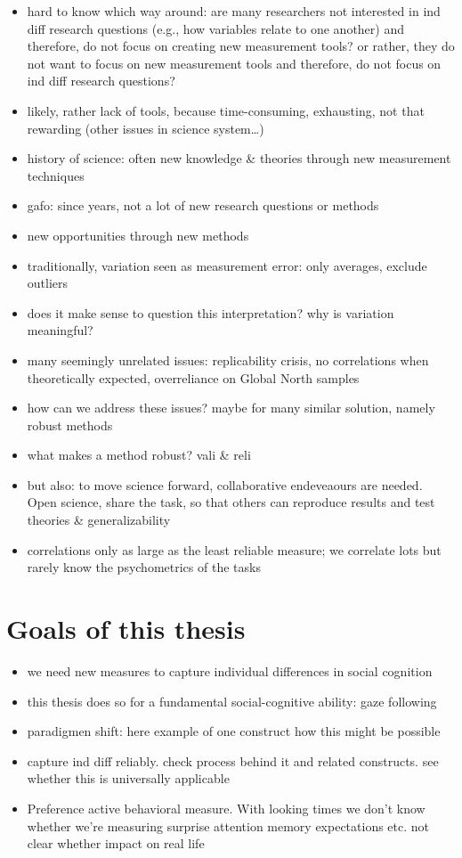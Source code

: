 \documentclass[
]{scrbook}
\providecommand{\tightlist}{%
  \setlength{\itemsep}{0pt}\setlength{\parskip}{0pt}}
\begin{document}
\begin{itemize}
\tightlist
\item
  hard to know which way around: are many researchers not interested in ind diff research questions (e.g., how variables relate to one another) and therefore, do not focus on creating new measurement tools? or rather, they do not want to focus on new measurement tools and therefore, do not focus on ind diff research questions?
\item
  likely, rather lack of tools, because time-consuming, exhausting, not that rewarding (other issues in science system\ldots)
\item
  history of science: often new knowledge \& theories through new measurement techniques
\item
  gafo: since years, not a lot of new research questions or methods
\item
  new opportunities through new methods
\item
  traditionally, variation seen as measurement error: only averages, exclude outliers
\item
  does it make sense to question this interpretation? why is variation meaningful?
\item
  many seemingly unrelated issues: replicability crisis, no correlations when theoretically expected, overreliance on Global North samples
\item
  how can we address these issues? maybe for many similar solution, namely robust methods
\item
  what makes a method robust? vali \& reli
\item
  but also: to move science forward, collaborative endeveaours are needed. Open science, share the task, so that others can reproduce results and test theories \& generalizability
\item
  correlations only as large as the least reliable measure; we correlate lots but rarely know the psychometrics of the tasks
\end{itemize}

\section{Goals of this thesis}\label{goals-of-this-thesis}

\begin{itemize}
\tightlist
\item
  we need new measures to capture individual differences in social cognition
\item
  this thesis does so for a fundamental social-cognitive ability: gaze following
\item
  paradigmen shift: here example of one construct how this might be possible
\item
  capture ind diff reliably. check process behind it and related constructs. see whether this is universally applicable
\item
  Preference active behavioral measure. With looking times we don't know whether we're measuring surprise attention memory expectations etc. not clear whether impact on real life
\end{itemize}
\end{document}
